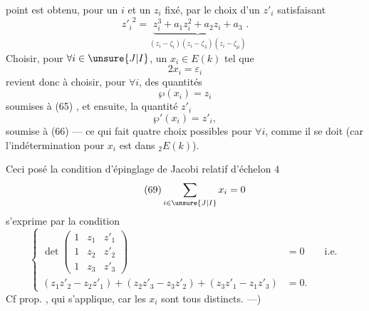 point est obtenu, pour un $i$ et un $z_i$ fixé, par le choix d'un $z'_i$ satisfaisant
\[
\tag{66}
{z'_i}^2=\underbrace{z_i^3+a_1z_i^2+a_2z_i+a_3}_{(z_i-\zeta_i)(z_i-\zeta_\lambda)(z_i-\zeta_\mu)}.
\]
Choisir, pour $\forall i\in\unsure{J|I}$, un $x_i\in E(k)$ tel que
\[
\tag{67}
2x_i=\varepsilon_i
\]
revient donc à choisir, pour $\forall i$, des quantités
\[
\tag{68a}
\wp(x_i)=z_i
\]
soumises à (65) , et ensuite, la quantité $z'_i$
\[
\tag{68b}
\wp'(x_i)=z'_i,
\]
soumise à (66) --- ce qui fait quatre choix possibles pour $\forall i$, comme il se doit (car l'indétermination pour $x_i$ est dans $ {}_2E(k)$).

Ceci posé la condition d'épinglage de Jacobi relatif d'échelon $4$
\[
\tag{69}
\sum_{i\in\unsure{J|I}}x_i=0
\]
s'exprime par la condition
\[
\tag{70}
\left\{\begin{aligned}
\det\begin{pmatrix}
1&z_1&z'_1\\
1&z_2&z'_2\\
1&z_3&z'_3
\end{pmatrix}&=0\qquad\text{i.e.}\\
(z_1z'_2-z_2z'_1)+(z_2z'_3-z_3z'_2)+(z_3z'_1-z_1z'_3)&=0.
\end{aligned}\right.
\]
Cf prop. , qui s'applique, car les $x_i$ sont tous distincts. ---)
